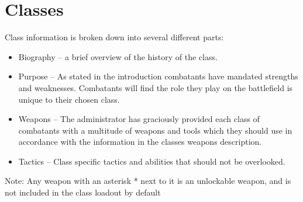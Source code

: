 \section{Classes}

Class information is broken down into several different parts:
\begin{itemize}
	\item Biography – a brief overview of the history of the class.
	\item Purpose – As stated in the introduction combatants have mandated strengths and weaknesses.  Combatants will find the role they play on the battlefield is unique to  their chosen class. 
	\item Weapons – The administrator has graciously provided each class of combatants with a multitude of weapons and tools which they should use in accordance with the information in the classes weapons description. 
	\item Tactics – Class specific tactics and abilities that should not be overlooked.
\end{itemize}
Note: Any weapon with an asterisk * next to it is an unlockable weapon, and is not included in the class loadout by default

\newpage


\newpage


\newpage


\newpage


\newpage



\newpage


\newpage


\newpage


\newpage


